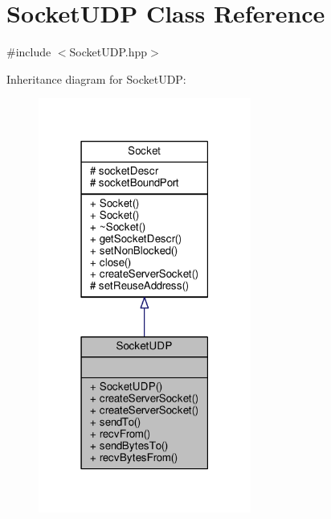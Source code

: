 \hypertarget{class_socket_u_d_p}{\section{Socket\-U\-D\-P Class Reference}
\label{class_socket_u_d_p}
}


{\ttfamily \#include $<$Socket\-U\-D\-P.\-hpp$>$}



Inheritance diagram for Socket\-U\-D\-P\-:
\nopagebreak
\begin{figure}[H]
\begin{center}
\leavevmode
\includegraphics[width=198pt]{class_socket_u_d_p__inherit__graph}
\end{center}
\end{figure}



